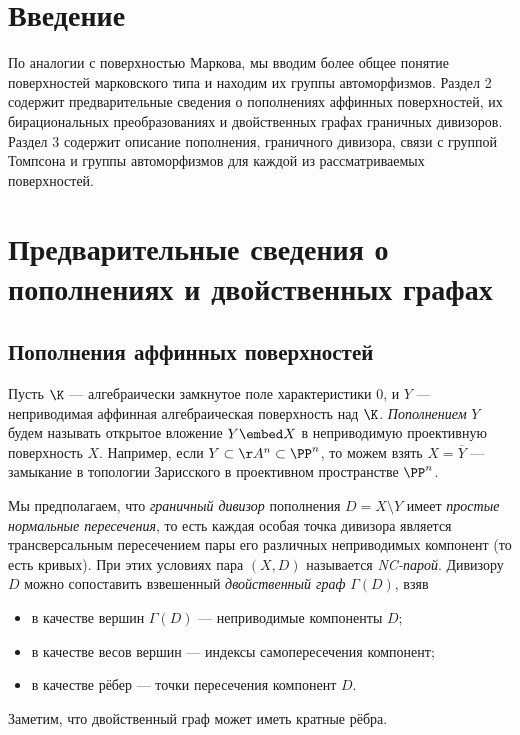 
\section{Введение}
По аналогии с поверхностью Маркова, мы вводим более общее понятие поверхностей марковского типа и находим их группы автоморфизмов. 
Раздел 2 содержит предварительные сведения о пополнениях аффинных поверхностей, их бирациональных преобразованиях и двойственных графах граничных дивизоров. Раздел 3 содержит описание пополнения, граничного дивизора, связи с группой Томпсона и группы автоморфизмов для каждой из рассматриваемых поверхностей.


\section{Предварительные сведения о пополнениях и двойственных графах}


\subsection{Пополнения аффинных поверхностей}
Пусть $\K$ --- алгебраически замкнутое поле характеристики 0, и $Y$ --- неприводимая аффинная алгебраическая поверхность над $\K$. \emph{Пополнением} $Y$ будем называть открытое вложение $Y\embed X$ в неприводимую проективную поверхность $X$. Например, если $Y\subset \AA^n\subset\PP^n$, то можем взять $X=\overline{Y}$ --- замыкание в топологии Зарисского в проективном пространстве $\PP^n$. 

Мы предполагаем, что \emph{граничный дивизор} пополнения $D=X\setminus Y$ имеет \emph{простые нормальные пересечения}, то есть каждая особая точка дивизора является трансверсальным пересечением пары его различных неприводимых компонент (то есть кривых). При этих условиях пара $(X,D)$ называется \emph{NC-парой}.  Дивизору $D$ можно сопоставить взвешенный \emph{двойственный граф} $\Gamma(D)$, взяв
\begin{itemize}
    \item в качестве вершин $\Gamma(D)$ --- неприводимые компоненты $D$;
    \item в качестве весов вершин --- индексы самопересечения компонент;
    \item в качестве рёбер --- точки пересечения компонент $D$.
\end{itemize}
Заметим, что двойственный граф может иметь кратные рёбра.


